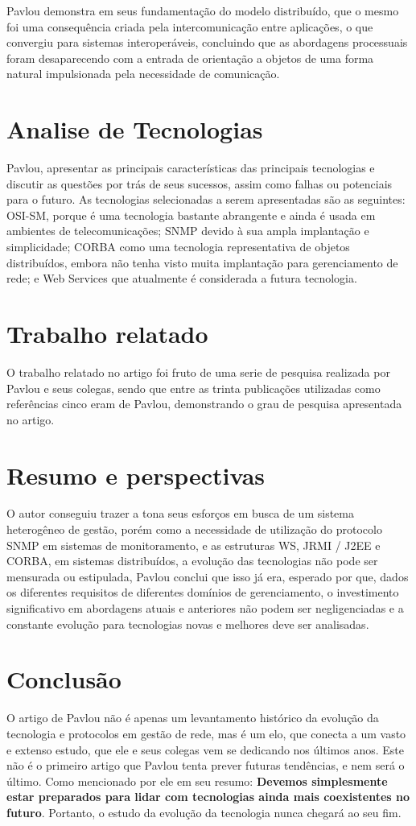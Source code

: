 \documentclass[12pt]{article}
\begin{document}
	Pavlou demonstra em seus fundamentação do modelo distribuído, que o mesmo foi uma consequência criada pela intercomunicação entre aplicações, o que convergiu para sistemas interoperáveis, concluindo que as abordagens processuais foram desaparecendo com a entrada de orientação a objetos de uma forma natural impulsionada pela necessidade de comunicação. 
	
\section{ Analise de Tecnologias}
	 Pavlou, apresentar as principais características das principais tecnologias e discutir as questões por trás de seus sucessos, assim como falhas ou potenciais para o futuro. As tecnologias selecionadas a serem apresentadas são as seguintes: OSI-SM, porque é uma tecnologia bastante abrangente e ainda é usada em ambientes de telecomunicações; SNMP devido à sua ampla implantação e simplicidade; CORBA como uma tecnologia representativa de objetos distribuídos, embora não tenha visto muita implantação para gerenciamento de rede; e Web Services que atualmente  é considerada a futura tecnologia.
	
\section{Trabalho relatado}
	O trabalho relatado no artigo foi fruto de uma serie de pesquisa realizada por Pavlou e seus colegas, sendo que entre as trinta publicações utilizadas como referências cinco eram de Pavlou, demonstrando o grau de pesquisa apresentada no artigo. 

\section{Resumo e perspectivas}
	O autor conseguiu trazer a tona seus esforços em busca de um sistema heterogêneo de gestão, porém como a necessidade de utilização do protocolo SNMP em sistemas de monitoramento, e as estruturas WS, JRMI / J2EE e CORBA, em sistemas distribuídos, a evolução das tecnologias não pode ser mensurada ou estipulada, Pavlou conclui que isso já era, esperado por que, dados os diferentes requisitos de diferentes domínios de gerenciamento, o investimento significativo em abordagens atuais e anteriores não podem ser negligenciadas e a constante evolução para tecnologias novas e melhores deve ser analisadas.
		
\section*{Conclusão}
	O artigo de Pavlou não é apenas um levantamento histórico da evolução da tecnologia e protocolos em gestão de rede, mas é um elo, que conecta a um vasto e extenso estudo, que ele e seus colegas vem se dedicando nos últimos anos.
Este não é o primeiro artigo que Pavlou tenta prever futuras tendências, e nem será o último. Como mencionado por ele em seu resumo: \textbf{Devemos simplesmente estar preparados para lidar com tecnologias ainda mais coexistentes no futuro}. Portanto, o estudo da evolução da tecnologia nunca chegará ao seu fim.

\end{document}

